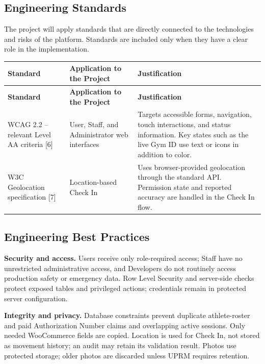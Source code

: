 \documentclass[11pt,letterpaper]{article}
\begin{document}
\subsection{Engineering Standards}

The project will apply standards that are directly connected to the technologies and risks of the platform. Standards are included only when they have a clear role in the implementation.

\begin{center}
\small
\begin{longtable}{L{3.6cm} L{4.4cm} L{5.6cm}}
\toprule
\textbf{Standard} & \textbf{Application to the Project} & \textbf{Justification} \\
\midrule
\endfirsthead
\toprule
\textbf{Standard} & \textbf{Application to the Project} & \textbf{Justification} \\
\midrule
\endhead
\bottomrule
\endlastfoot

WCAG 2.2 -- relevant Level AA criteria [6]
&
User, Staff, and Administrator web interfaces
&
Targets accessible forms, navigation, touch interactions, and status information. Key states such as the live Gym ID use text or icons in addition to color. \\
\addlinespace
\midrule
\addlinespace

W3C Geolocation specification [7]
&
Location-based Check In
&
Uses browser-provided geolocation through the standard API. Permission state and reported accuracy are handled in the Check In flow. \\
\end{longtable}
\end{center}

\subsection{Engineering Best Practices}

\textbf{Security and access.} Users receive only role-required access; Staff have no unrestricted administrative access, and Developers do not routinely access production safety or emergency data. Row Level Security and server-side checks protect exposed tables and privileged actions; credentials remain in protected server configuration.

\textbf{Integrity and privacy.} Database constraints prevent duplicate athlete-roster and paid Authorization Number claims and overlapping active sessions. Only needed WooCommerce fields are copied. Location is used for Check In, not stored as movement history; an audit may retain its validation result. Photos use protected storage; older photos are discarded unless UPRM requires retention.
\end{document}
